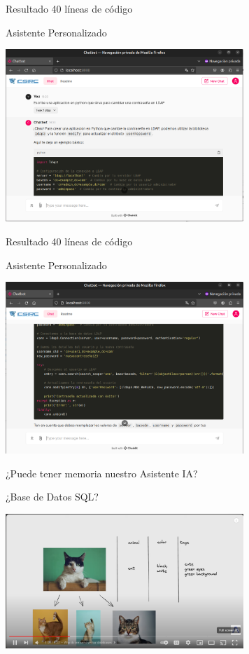 \documentclass[table, unknownkeysallowed, 10pt]{beamer}
\begin{document}
\begin{frame}{Resultado 40 líneas de código}
    \begin{block}{Asistente Personalizado}
    \begin{center}
        \includegraphics[width=9cm]{imagenes/chainlit1.png}
    \end{center}
\end{block}
\end{frame}

\begin{frame}{Resultado 40 líneas de código}
    \begin{block}{Asistente Personalizado}
    \begin{center}
        \includegraphics[width=9cm]{imagenes/chainlit2.png}
    \end{center}
\end{block}
\end{frame}

\begin{frame}{¿Puede tener memoria nuestro Asistente IA?}
    \begin{block}{¿Base de Datos SQL?}
    \begin{center}
        \includegraphics[width=9cm]{imagenes/vectorsql.png}
    \end{center}
\end{block}
\end{frame}
\end{document}
